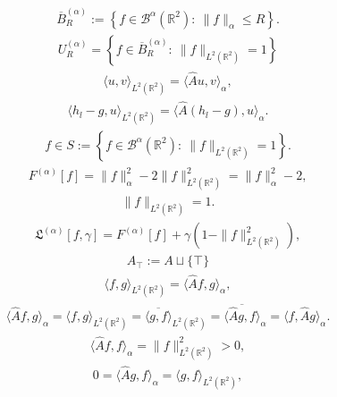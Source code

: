 \begin{align*}\overline{B}_R^{(\alpha)}:= \left\{f \in \mathcal{B}^{\alpha} (\mathbb{R}^2): ~\| f\|_{\alpha} \leq R \right\}.\end{align*}
\begin{align*}U_R^{(\alpha)}= \left\{ f \in \overline{B}_R^{(\alpha)}: ~ \|f \|_{L^2(\mathbb{R}^2)} =1 \right\}\end{align*}
\begin{align*}\langle u,v\rangle_{L^2 (\mathbb{R}^2)}=\langle\widehat{A} u,v\rangle_{\alpha},\end{align*}
\begin{align*}\langle h_l-g,u\rangle_{L^2 (\mathbb{R}^2)}=\langle\widehat{A} ( h_l-g), u\rangle_{\alpha}.\end{align*}
\begin{align*}f \in S:= \left\{f \in \mathcal{B}^{\alpha} (\mathbb{R}^2): ~ \|f\|_{L^2 (\mathbb{R}^2)} =1 \right\}.\end{align*}
\begin{align*}F^{(\alpha)} \left[f \right]= \| f \|_{\alpha}^2 -2 \|f \|_{L^2 (\mathbb{R}^2)}^2 =\| f \|_{\alpha}^2 -2 ,\end{align*}
\begin{align*}\|f \|_{L^2 (\mathbb{R}^2)} = 1.\end{align*}
\begin{align*}\mathfrak{L}^{(\alpha)} \left[f , \gamma \right] = F^{(\alpha)} \left[f \right] + \gamma \left( 1- \|f \|_{L^2 (\mathbb{R}^2)}^2 \right),\end{align*}
\begin{align*}A_\top := A \sqcup \{\top\}\end{align*}
\begin{align*}\langle f, g \rangle_{L^2 (\mathbb{R}^2)}= \langle \widehat{A}f,g \rangle_{\alpha},\end{align*}
\begin{align*}\langle \widehat{A}f, g \rangle_{\alpha} = \langle f, g \rangle_{L^2 (\mathbb{R}^2)} = \overline{\langle g,f \rangle}_{L^2 (\mathbb{R}^2)} = \overline{\langle \widehat{A}g,f \rangle }_{\alpha} = \langle f,\widehat{A}g \rangle_{\alpha} .\end{align*}
\begin{align*}\langle \widehat{A} f,f \rangle_{\alpha} = \|f \|_{L^2 (\mathbb{R}^2)}^2 >0,\end{align*}
\begin{align*}0= \langle \widehat{A}g,f \rangle_{\alpha} = \langle g,f \rangle_{L^2 (\mathbb{R}^2)},\end{align*}
